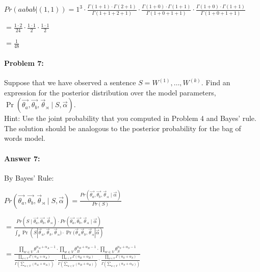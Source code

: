 \documentclass[10pt]{article}
\begin{document}
$ Pr(aabab|(1,1))

=1^3\cdot{\frac{\Gamma{(1+1)}\cdot\Gamma{(2+1)}}{\Gamma{(1+1+2+1)}}}\cdot{\frac{\Gamma{(1+0)}\cdot\Gamma{(1+1)}}{\Gamma{(1+0+1+1)}}}\cdot{\frac{\Gamma{(1+0)}\cdot\Gamma{(1+1)}}{\Gamma{(1+0+1+1)}}}$

$ =\frac{1\cdot2}{24}\cdot\frac{1\cdot1}{2}\cdot\frac{1\cdot1}{2}$

$ =\frac{1}{48}$


\noindent\hrulefill %

\paragraph{Problem 7:}

Suppose that we have observed a sentence
$S=W^{(1)},\dots,W^{(k)}$. Find an expression for the posterior
distribution over the model parameters,
$\Pr(\vec{\theta_a}, \vec{\theta_b}, \vec{\theta}_{\rtimes} \mid S,
\vec{\alpha})$.\\

\noindent Hint: Use the joint probability that you computed in Problem
4 and Bayes' rule. The solution should be analogous to the posterior
probability for the bag of words model.

\paragraph{Answer 7:} By Bayes' Rule: 

$Pr(\vec{\theta_a}, \vec{\theta_b}, \vec{\theta}_{\rtimes} \mid S,\vec{\alpha}) = \frac{Pr(\vec{\theta_a}, \vec{\theta_b}, \vec{\theta}_{\rtimes} \mid \vec{\alpha})}{Pr(S)}$

$=\frac{Pr(S \mid \vec{\theta_a}, \vec{\theta_b}, \vec{\theta}_{\rtimes})\cdot Pr(\vec{\theta_a}, \vec{\theta_b}, \vec{\theta}_{\rtimes} \mid \vec{\alpha})}{{\int_{\theta} \Pr(S | \vec{\theta}_{a}, \vec{\theta}_{b}, \vec{\theta}_{\rtimes})\cdot{\Pr(\vec{\theta}_{a}}\vec{\theta}_{b}, \vec{\theta}_{\rtimes}|\vec{\alpha})}}$

$=\frac{\prod_{w \in V} \theta_{A}^{n_A+\alpha_{A}-1}\cdot{\prod_{w \in V} \theta_{B}^{n_B+\alpha_{B}-1}\cdot{\prod_{w \in V} \theta_{S}^{n_S+\alpha_{S}-1}}}}{\frac{\prod_{w \in V} \Gamma(n_A+\alpha_{A})}{\Gamma(\sum_{w \in V} (n_A+\alpha_{A}))}\cdot{\frac{\prod_{w \in V} \Gamma(n_B+\alpha_{B})}{\Gamma(\sum_{w \in V} (n_B+\alpha_{B}))}\cdot{\frac{\prod_{w \in V} \Gamma(n_S+\alpha_{S})}{\Gamma(\sum_{w \in V} (n_S+\alpha_{S}))}}}}$
\end{document}
